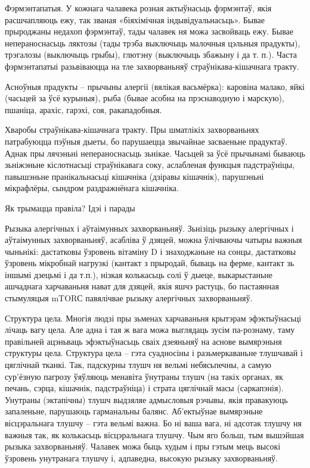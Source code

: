 Фэрмэнтапатыя.
У кожнага чалавека розная актыўнасьць фэрмэнтаў, якія расшчапляюць ежу, так званая «біяхімічная індывідуальнасьць». Бывае прыроджаны недахоп фэрмэнтаў, тады чалавек ня можа засвойваць ежу. Бывае непераноснасьць ляктозы (тады трэба выключыць малочныя цэльныя прадукты), трэгалозы (выключыць грыбы), глютэну (выключыць збажыну і да т. п.). Часта фэрмэнтапатыі разьвіваюцца на тле захворваньняў страўнікава-кішачнага тракту.

Асноўныя прадукты – прычыны алергіі (вялікая васьмёрка): каровіна малако, яйкі (часьцей за ўсё курыныя), рыба (бывае асобна на прэснаводную і марскую), пшаніца, арахіс, гарэхі, соя, ракападобныя.

Хваробы страўнікава-кішачнага тракту.
Пры шматлікіх захворваньнях патрабуюцца пэўныя дыеты, бо парушаецца звычайнае засваеньне прадуктаў. Аднак пры лячэньні непераноснасьць зьнікае. Часьцей за ўсё прычынамі бываюць зьніжэньне кіслотнасьці страўнікавага соку, аслабленая функцыя падстраўніцы, павышэньне пранікальнасьці кішачніка (дзіравы кішачнік), парушэньні мікрафлёры, сындром раздражнёнага кішачніка.

Як трымацца правіла? Ідэі і парады

Рызыка алергічных і аўтаімунных захворваньняў.
Зьнізіць рызыку алергічных і аўтаімунных захворваньняў, асабліва ў дзяцей, можна ўлічваючы чатыры важныя чыньнікі: дастатковы ўзровень вітаміну D і знаходжаньне на сонцы, дастатковы ўзровень мікробнай нагрузкі (кантакт з прыродай, бываць на ферме, кантакт зь іншымі дзецьмі і да т.п.), нізкая колькасьць солі ў дыеце, выкарыстаньне ашчаднага харчаваньня нават для дзяцей, якія яшчэ растуць, бо пастаянная стымуляцыя mTORС павялічвае рызыку алергічных захворваньняў.

Структура цела.
Многія людзі пры зьменах харчаваньня крытэрам эфэктыўнасьці лічаць вагу цела. Але адна і тая ж вага можа выглядаць зусім па-рознаму, таму правільней ацэньваць эфэктыўнасьць сваіх дзеяньняў на аснове вымярэньня структуры цела. Структура цела – гэта суадносіны і разьмеркаваньне тлушчавай і цяглічнай тканкі. Так, падскурны тлушч ня вельмі небясьпечны, а самую сур'ёзную пагрозу ўяўляюць менавіта ўнутраны тлушч (на такіх органах, як печань, сэрца, кішачнік, падстраўніца) і страта цяглічнай масы (саркапэнія). Унутраны (эктапічны) тлушч выдзяляе адмысловыя рэчывы, якія правакуюць запаленьне, парушаюць гарманальны балянс. Аб'ектыўнае вымярэньне вісцэральнага тлушчу – гэта вельмі важна. Бо ні ваша вага, ні адсотак тлушчу ня важныя так, як колькасьць вісцэральнага тлушчу. Чым яго больш, тым вышэйшая рызыка захворваньняў. Чалавек можа быць худым і пры гэтым мець высокі ўзровень унутранага тлушчу і, адпаведна, высокую рызыку захворваньняў.

